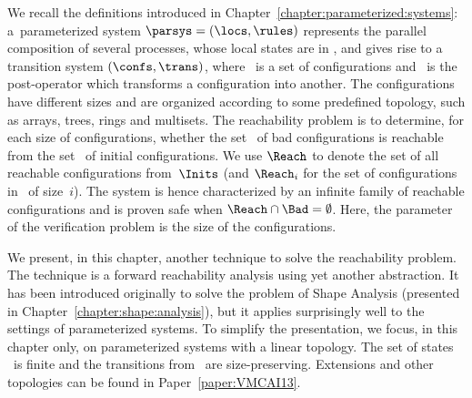 %
%
We recall the definitions introduced in
Chapter~\ref{chapter:parameterized:systems}: a~parameterized system
$\parsys=(\locs,\rules)$ represents the parallel composition of
several processes, whose local states are in \locs,
and gives rise to a transition system $(\confs,\trans)$, where \confs\ is
a set of configurations and \trans\ is the post-operator which
transforms a configuration into another.
%
The configurations have different sizes and are organized according to
some predefined topology, such as arrays, trees, rings and multisets.
%
%
%
The reachability problem is to determine, for each size of
configurations, whether the set \Bad\ of bad configurations is
reachable from the set \Inits\ of initial configurations.
%
We use $\Reach$ to denote the set of all reachable configurations
from~$\Inits$ (and $\Reach_i$ for the set of configurations in \Reach\
of size~$i$). %
%
The system is hence characterized by an infinite family of reachable
configurations and is proven safe when $\Reach\cap\Bad = \emptyset$.
%
Here, the parameter of the verification problem is the size of the
configurations.

%
%
We present, in this chapter, another technique to solve the
reachability problem.
%
The technique is a forward reachability analysis using yet another
abstraction.
%
It has been introduced originally to solve the problem of Shape
Analysis (presented in Chapter~\ref{chapter:shape:analysis}), but it
applies surprisingly well to the settings of parameterized systems.
%
%
%
%
To simplify the presentation, we focus, in this chapter only, on
parameterized systems with a linear topology. The set of states \locs\
is finite and the transitions from \ are size-preserving.
%
Extensions and other topologies can be found in
Paper~\ref{paper:VMCAI13}.


